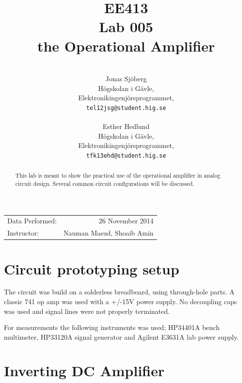 \documentclass[11pt,a4paper]{article}
\title{EE413 \\ Lab 005 \\ the Operational Amplifier}
\author{\\
  Jonas Sjöberg\\
  Högskolan i Gävle,\\
  Elektronikingenjörsprogrammet,\\
  \texttt{tel12jsg@student.hig.se}\\
  \\
  Esther Hedlund\\
  Högskolan i Gävle,\\
  Elektronikingenjörsprogrammet,\\
  \texttt{tfk13ehd@student.hig.se}\\}
\date{}
\begin{document}
\maketitle

\begin{center}
\begin{tabular}{l r}
    Data Performed: & 26 November 2014 \\
    Instructor: & Nauman Masud, Shoaib Amin
\end{tabular}
\end{center}

\begin{abstract}
This lab is meant to show the practical use of the operational amplifier in
analog circuit design. Several common circuit configurations will be discussed.
\end{abstract}

\newpage

{
\setcounter{tocdepth}{3}
\tableofcontents
}

\newpage

\section{Circuit prototyping setup}\label{setup}
The circuit was build on a solderless breadboard, using through-hole parts.
A classic 741 op amp was used with a +/-15V power supply.
No decoupling caps was used and signal lines were not properly terminated.

For measurements the following instruments was used; HP34401A bench multimeter,
HP33120A signal generator and Agilent E3631A lab power supply.

\section{Inverting DC Amplifier}\label{inverting-dc-amplifier}
\end{document}
